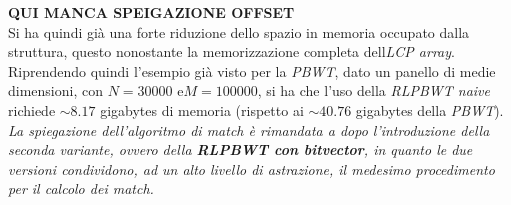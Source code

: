 \textbf{QUI MANCA SPEIGAZIONE OFFSET}\\
Si ha quindi già una forte riduzione dello spazio in memoria occupato dalla
struttura, questo nonostante la memorizzazione completa dell\textit{LCP array}.
Riprendendo quindi l'esempio già visto per la \textit{PBWT}, dato un panello di
medie dimensioni, con $N = 30000$ e$ M = 100000$, si ha che l'uso della
\textit{RLPBWT naive} richiede $\sim 8.17$ gigabytes di memoria (rispetto ai
$\sim 40.76$ gigabytes della \textit{PBWT}).\\
\textit{La spiegazione dell'algoritmo di match è rimandata a dopo l'introduzione
  della seconda variante, ovvero della \textbf{RLPBWT con bitvector}, in quanto
  le due versioni condividono, ad un alto livello di astrazione, il medesimo
  procedimento per il calcolo dei match.}